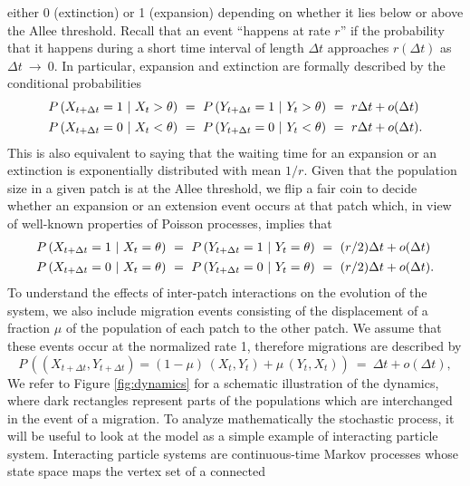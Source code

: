  either 0 (extinction) or 1 (expansion) depending on whether it lies below or above the Allee threshold.
 Recall that an event ``happens at rate $r$'' if the probability that it happens during a short time interval of
 length $\Delta t$ approaches $r (\Delta t)$ as $\Delta t \ {{\rightarrow}} \ 0$.
 In particular, expansion and extinction are formally described by the conditional probabilities
 $$ \begin{array}{l}
  P \,(X_{t + \Delta t} = 1 \ | \ X_t > \theta) \ = \
  P \,(Y_{t + \Delta t} = 1 \ | \ Y_t > \theta) \ = \ r \Delta t + o (\Delta t) \vspace{4pt} \\
  P \,(X_{t + \Delta t} = 0 \ | \ X_t < \theta) \ = \
  P \,(Y_{t + \Delta t} = 0 \ | \ Y_t < \theta) \ = \ r \Delta t + o (\Delta t). \end{array} $$
 This is also equivalent to saying that the waiting time for an expansion or an extinction is exponentially
 distributed with mean $1 / r$.
 Given that the population size in a given patch is at the Allee threshold, we flip a fair coin to decide whether an
 expansion or an extension event occurs at that patch which, in view of well-known properties of Poisson processes,
 implies that
 $$ \begin{array}{l}
  P \,(X_{t + \Delta t} = 1 \ | \ X_t = \theta) \ = \
  P \,(Y_{t + \Delta t} = 1 \ | \ Y_t = \theta) \ = \ (r / 2) \Delta t + o (\Delta t) \vspace{4pt} \\
  P \,(X_{t + \Delta t} = 0 \ | \ X_t = \theta) \ = \
  P \,(Y_{t + \Delta t} = 0 \ | \ Y_t = \theta) \ = \ (r / 2) \Delta t + o (\Delta t). \end{array} $$
 To understand the effects of inter-patch interactions on the evolution of the system, we also include migration events
 consisting of the displacement of a fraction $\mu$ of the population of each patch to the other patch.
 We assume that these events occur at the normalized rate 1, therefore migrations are described by
 $$ P \,((X_{t + \Delta t}, Y_{t + \Delta t}) = (1 - \mu) \,(X_t, Y_t) + \mu \,(Y_t, X_t)) \ = \ \Delta t + o (\Delta t), $$
 We refer to Figure \ref{fig:dynamics} for a schematic illustration of the dynamics, where dark rectangles represent parts
 of the populations which are interchanged in the event of a migration. 
 To analyze mathematically the stochastic process, it will be useful to look at the model as a simple example of interacting
 particle system.
 Interacting particle systems are continuous-time Markov processes whose state space maps the vertex set of a connected
